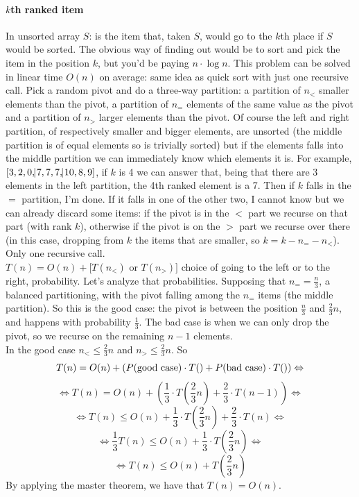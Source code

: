 \documentclass[10pt]{report}
\begin{document}
\paragraph{$k$th ranked item} In unsorted array $S$: is the item that, taken $S$, would go to the $k$th place if $S$ would be sorted. The obvious way of finding out would be to sort and pick the item in the position $k$, but you'd be paying $n\cdot\log n$. This problem can be solved in linear time $O(n)$ on average: same idea as quick sort with just one recursive call. Pick a random pivot and do a three-way partition: a partition of $n_<$ smaller elements than the pivot, a partition of $n_=$ elements of the same value as the pivot and a partition of $n_>$ larger elements than the pivot. Of course the left and right partition, of respectively smaller and bigger elements, are unsorted (the middle partition is of equal elements so is trivially sorted) but if the elements falls into the middle partition we can immediately know which elements it is. For example, $[3,2,0,\vline7,7,7,\vline10,8,9]$, if $k$ is 4 we can answer that, being that there are $3$ elements in the left partition, the 4th ranked element is a 7. Then if $k$ falls in the $=$ partition, I'm done. If it falls in one of the other two, I cannot know but we can already discard some items: if the pivot is in the $<$ part we recurse on that part (with rank $k$), otherwise if the pivot is on the $>$ part we recurse over there (in this case, dropping from $k$ the items that are smaller, so $k = k - n_= - n_<$). Only one recursive call.\\
$T(n) = O(n) + [T(n_<)$ or $T(n_>)]$ choice of going to the left or to the right, probability. Let's analyze that probabilities. Supposing that $n_= = \frac{n}{3}$, a balanced partitioning, with the pivot falling among the $n_=$ items (the middle partition). So this is the good case: the pivot is between the position $\frac{n}{3}$ and $\frac{2}{3}n$, and happens with probability $\frac{1}{3}$. The bad case is when we can only drop the pivot, so we recurse on the remaining $n-1$ elements.\\
In the good case $n_< \leq \frac{2}{3}n$ and $n_> \leq 	\frac{2}{3}n$. So $$T(n) = O(n) + (P(\hbox{good case})\cdot T() + P(\hbox{bad case})\cdot T()) \Leftrightarrow$$
$$\Leftrightarrow T(n) = O(n) + \left(\frac{1}{3}\cdot T\left(\frac{2}{3}n\right) + \frac{2}{3}\cdot T(n - 1)\right) \Leftrightarrow$$
$$\Leftrightarrow T(n) \leq O(n) + \frac{1}{3}\cdot T\left(\frac{2}{3}n\right) + \frac{2}{3}\cdot T(n) \Leftrightarrow$$
$$\Leftrightarrow \frac{1}{3}T(n) \leq O(n) + \frac{1}{3}\cdot T\left(\frac{2}{3}n\right) \Leftrightarrow$$
$$\Leftrightarrow T(n) \leq O(n) + T\left(\frac{2}{3}n\right)$$
By applying the master theorem, we have that $T(n) = O(n)$.
\end{document}
